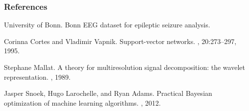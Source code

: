 \documentclass{beamer}
\begin{document}
\begin{frame}\frametitle{References}
 \begin{thebibliography}{}

University of Bonn.
\newblock Bonn EEG dataset for epileptic seizure analysis.

Corinna Cortes and Vladimir Vapnik.
\newblock Support-vector networks.
, 20:273--297, 1995.

Stephane Mallat.
\newblock A theory for multiresolution signal decomposition: the wavelet representation.
, 1989.

Jasper Snoek, Hugo Larochelle, and Ryan Adams.
\newblock Practical Bayesian optimization of machine learning algorithms.
, 2012.

\end{thebibliography}
\end{frame}
\end{document}

